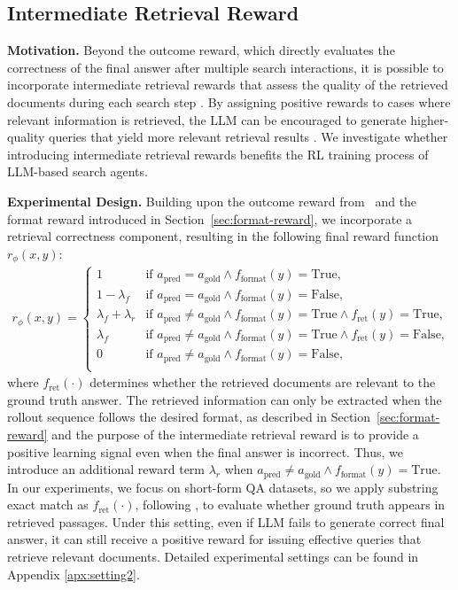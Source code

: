 \subsection{Intermediate Retrieval Reward}\label{sec:retrieval-reward}

\textbf{Motivation.} 
Beyond the outcome reward, which directly evaluates the correctness of the final answer after multiple search interactions, it is possible to incorporate intermediate retrieval rewards that assess the quality of the retrieved documents during each search step \cite{lin2025rec}.
By assigning positive rewards to cases where relevant information is retrieved, the LLM can be encouraged to generate higher-quality queries that yield more relevant retrieval results \cite{lin2025rec}.
We investigate whether introducing intermediate retrieval rewards benefits the RL training process of LLM-based search agents.

\textbf{Experimental Design.} 
Building upon the outcome reward from~\citep{jin2025search,zheng2025deepresearcher} and the format reward introduced in Section~\ref{sec:format-reward}, we incorporate a retrieval correctness component, resulting in the following final reward function $r_{\phi}(x, y)$:
\begin{gather}
r_{\phi}(x, y) = 
\begin{cases}
    1              & \text{if } a_{\text{pred}} = a_{\text{gold}} \land f_{\text{format}}(y) = \text{True}, \\
    1 - \lambda_f    & \text{if } a_{\text{pred}} = a_{\text{gold}} \land f_{\text{format}}(y) = \text{False}, \\
    \lambda_f + \lambda_r       & \text{if } a_{\text{pred}} \neq a_{\text{gold}} \land f_{\text{format}}(y) = \text{True} \land f_{\text{ret}}(y) = \text{True}, \\
    \lambda_f        & \text{if } a_{\text{pred}} \neq a_{\text{gold}} \land f_{\text{format}}(y) = \text{True} \land f_{\text{ret}}(y) = \text{False}, \\
    0              & \text{if } a_{\text{pred}} \neq a_{\text{gold}} \land f_{\text{format}}(y) = \text{False}, \\
\end{cases}
\end{gather}
where $f_\text{ret}(\cdot)$ determines whether the retrieved documents are relevant to the ground truth answer.
The retrieved information can only be extracted when the rollout sequence follows the desired format, as described in Section~\ref{sec:format-reward} and the purpose of the intermediate retrieval reward is to provide a positive learning signal even when the final answer is incorrect. Thus, we introduce an additional reward term $\lambda_r$ when $a_{\text{pred}} \neq a_{\text{gold}} \land f_{\text{format}}(y) = \text{True}$.
In our experiments, we focus on short-form QA datasets, so we apply substring exact match as $f_\text{ret}(\cdot)$, following \cite{jin2024long,lin2023ra}, 
to evaluate whether ground truth appears in retrieved passages.
Under this setting, even if LLM fails to generate correct final answer, it can still receive a positive reward for issuing effective queries that retrieve relevant documents.
Detailed experimental settings can be found in Appendix \ref{apx:setting2}.

